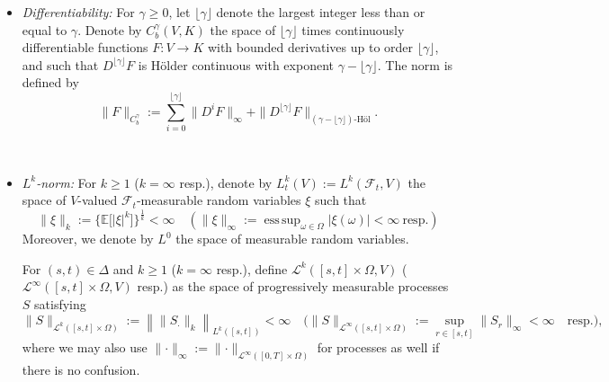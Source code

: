 \documentclass[11pt,reqno]{amsart}
\DeclareMathOperator*{\esssup}{ess\,sup}
\numberwithin{equation}{section}
\def\E{\mathbb E}
\begin{document}
\begin{itemize}[leftmargin=1.2em, labelsep=0.2em]
A path $\mathrm{X} \in C([0,T],V)$ is called a Lipschitz path if it is Lipschitz continuous in time. It is termed a smooth path if it possesses continuous derivatives of all orders on the closed interval $[0,T]$, in which case we write $\mathrm{X} \in C^{\infty}([0,T],V)$. For a Lipschitz path $\mathrm{X}$, we define its (canonical) lift as the pair $\mathbf{X} = (\mathrm{X},\mathbb{X})$, where the second-order component $\mathbb{X}_{s,t}$ is given by $\mathbb X_{s,t} := \int_{s}^{t} \delta \mathrm X_{s,r} \otimes \partial_r \mathrm X_{r} dr$, $(s,t) \in \Delta$. 

\

\item {\it Differentiability:} For $\gamma\ge 0$, let $\lfloor \gamma \rfloor$ denote the largest integer less than or equal to $\gamma$. Denote by $C^{\gamma}_b(V, K)$ the space of $\lfloor\gamma\rfloor$ times continuously differentiable functions $F: V \to K$ with bounded derivatives up to order $\lfloor\gamma\rfloor$,
and such that $D^{\lfloor\gamma\rfloor}F$ is H\"older continuous with
exponent $\gamma-\lfloor\gamma\rfloor$. The norm is defined by
\begin{equation*}
\|F\|_{C^{\gamma}_b}:=\sum_{i=0}^{\lfloor\gamma\rfloor} \| D^i F \|_{\infty} + \|D^{\lfloor \gamma \rfloor} F\|_{(\gamma - \lfloor \gamma \rfloor)\text{-H\"ol}}.
\end{equation*}


\ 

\item {\it $L^{k}$-norm:} For $k \ge 1$ ($k = \infty$ resp.), denote by  
$L^{k}_{t}(V) := L^{k}(\mathcal F_t,V)$ the space of $V$-valued
$\mathcal F_t$-measurable random variables $\xi$ such that
\begin{equation*}
\|\xi\|_{k} := \big\{\E\big[|\xi|^k\big]\big\}^{\frac1k} < \infty \quad (\|\xi\|_{\infty} := \esssup_{\omega\in\Omega} |\xi(\omega)| < \infty\ \text{resp.})
\end{equation*}
Moreover, we denote by $L^0$ the space of measurable random variables.

For $(s,t) \in \Delta$ and $k\ge 1$ ($k=\infty$ resp.), define $\mathcal L^{k}([s,t]\times\Omega,V)$ ($\mathcal L^{\infty}([s,t]\times\Omega,V)$ resp.) as the space of progressively measurable processes $S$ satisfying 
\begin{equation*}
\|S\|_{\mathcal L^{k}([s,t] \times \Omega)} := \left\| \|S_{\bm\cdot}\|_k \right\|_{L^{k}([s,t])}
< \infty \quad \Big(\|S\|_{\mathcal L^{\infty}([s,t] \times \Omega)}:=  \sup_{r\in[s,t]}\|S_r\|_{\infty} < \infty  \quad \text{resp.}\Big), 
\end{equation*}
where we may also use  $\|\bm\cdot\|_{\infty} := \|\bm\cdot\|_{\mathcal L^{\infty }([0,T]\times \Omega)}$ for processes as well if there is no confusion. 


\end{itemize}
\end{document}
